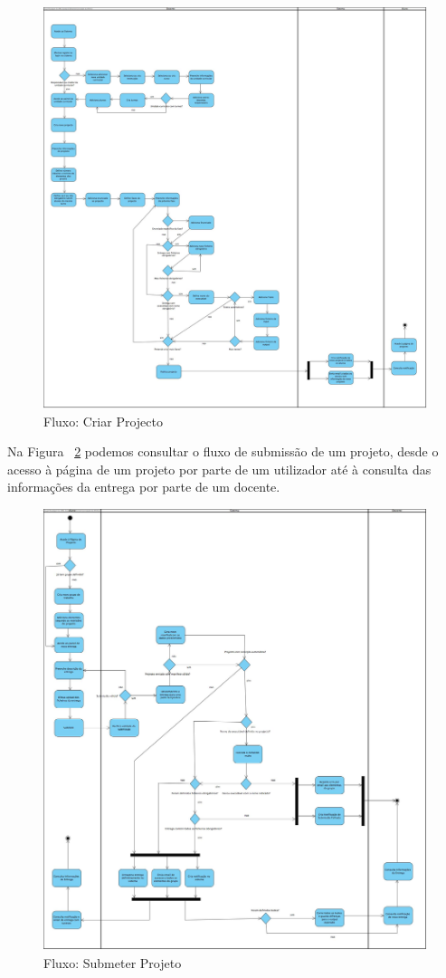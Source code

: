 \begin{figure}[H] 
  \centering
  \includegraphics[width=1\textwidth,center]{images/arquitetura/criacao-projecto}
  \caption{Fluxo: Criar Projecto}
  \label{fig:criacao-projecto}
\end{figure}

Na Figura ~\ref{fig:submissao-projecto} podemos consultar o fluxo de submissão de um projeto, desde o acesso à página de um projeto por parte de um utilizador até à consulta das informações da entrega por parte de um docente.

\begin{figure}[H] 
  \centering
  \includegraphics[width=1\textwidth,center]{images/arquitetura/submissao-projecto}
  \caption{Fluxo: Submeter Projeto}
  \label{fig:submissao-projecto}
\end{figure}

\newpage
